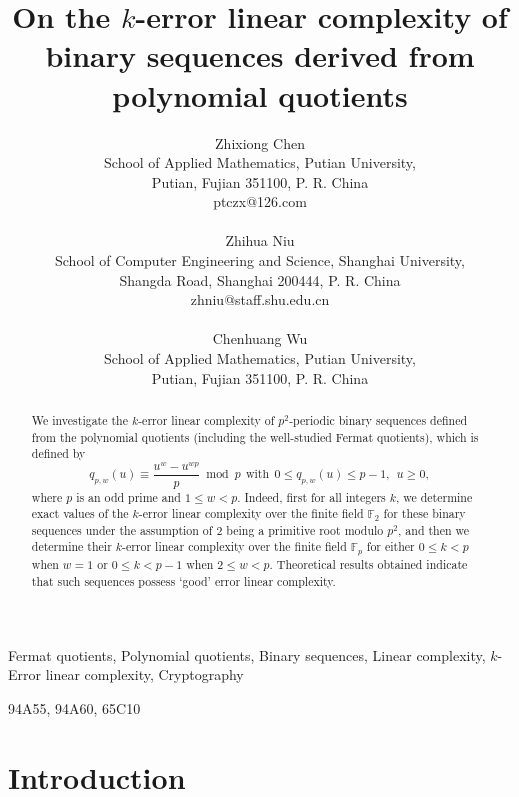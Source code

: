 \documentclass [11pt,a4paper]{article}
\def\F{\mathbb{F}}
\begin{document}
\title{On the $k$-error linear complexity of binary
sequences derived from polynomial quotients}

\author{Zhixiong Chen\\
School of Applied Mathematics, Putian University, \\ Putian, Fujian
351100, P. R. China\\
ptczx@126.com\\
\\
Zhihua Niu\\
School of Computer Engineering and Science, Shanghai University,\\
Shangda Road, Shanghai 200444, P. R. China \\
zhniu@staff.shu.edu.cn\\
\\
Chenhuang Wu\\
School of Applied Mathematics, Putian University, \\ Putian, Fujian
351100, P. R. China}
\maketitle


\begin{abstract}
We investigate the $k$-error linear complexity of $p^2$-periodic
binary sequences defined from the polynomial quotients (including the well-studied Fermat quotients), which is defined by
$$
q_{p,w}(u)\equiv \frac{u^w-u^{wp}}{p} \bmod p ~~  \mathrm{with}~~ 0
\le q_{p,w}(u) \le p-1, ~~u\ge 0,
$$
where $p$ is an odd prime and $1\le w<p$. Indeed, first for all integers $k$, we determine exact values of the $k$-error linear complexity over the finite field $\F_2$ for these binary sequences under the assumption of $2$ being a primitive root modulo $p^2$, and then we determine their $k$-error linear complexity over the finite field $\F_p$ for either $0\le k<p$ when $w=1$ or $0\le k<p-1$ when $2\le w<p$. Theoretical results obtained indicate that such sequences possess `good' error linear complexity.
\end{abstract}



  Fermat quotients, Polynomial quotients, Binary sequences, Linear complexity, $k$-Error linear complexity, Cryptography

 94A55, 94A60, 65C10


\section{Introduction}\label{intro}
\end{document}
